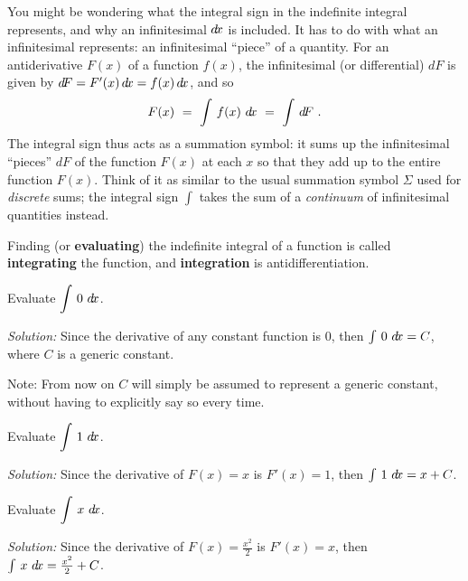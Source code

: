 \statecomment{\[
\ddx\,\left(\int\,f(x)~\dx\right) ~=~ f(x)
\]
}

You might be wondering what the integral sign in the indefinite integral
represents, and why an infinitesimal $d\!x$ is included. It has to do with what
an infinitesimal represents: an infinitesimal ``piece'' of a quantity. For an
antiderivative $F(x)$ of a function $f(x)$, the infinitesimal (or differential)
$d\!F$ is given by $d\!F = F'(x)\,d\!x = f(x)\,d\!x$, and so
\[
F(x) ~=~ \int\,f(x)~d\!x ~=~ \int\,d\!F ~.
\]
The integral sign thus acts as a summation symbol: it sums up the infinitesimal
``pieces'' $d\!F$ of the function $F(x)$ at each $x$ so that they add up to the
entire function $F(x)$. Think of it as similar to the usual summation symbol
$\Sigma$ used for \emph{discrete} sums; the integral sign $\int$ takes the sum
of a \emph{continuum} of infinitesimal quantities instead.

Finding (or \textbf{evaluating}) the indefinite integral of a function is
called \textbf{integrating} the function, and
\textbf{integration} is antidifferentiation.

\begin{exmp}\label{exmp:antideriv1}
\noindent Evaluate $\displaystyle\int\,0~d\!x$.\vspace{1mm}
\par\noindent\emph{Solution:} Since the derivative of any constant function is
0, then $\int\,0~d\!x = C$, where $C$ is a generic constant.\vspace{2mm}

\noindent Note: From now on $C$ will simply be assumed to represent a generic
constant, without having to explicitly say so every time.
\end{exmp}
\begin{exmp}\label{exmp:antideriv2}
\noindent Evaluate $\displaystyle\int\,1~d\!x$.\vspace{1mm}
\par\noindent\emph{Solution:} Since the derivative of $F(x) = x$ is
$F'(x) = 1$, then $\int\,1~d\!x = x + C$.
\end{exmp}
\begin{exmp}\label{exmp:antideriv3}
\noindent Evaluate $\displaystyle\int\,x~d\!x$.\vspace{1mm}
\par\noindent\emph{Solution:} Since the derivative of $F(x) = \frac{x^2}{2}$ is
$F'(x) = x$, then $\int\,x~d\!x = \frac{x^2}{2} + C$.
\end{exmp}
\divider
\vspace{3mm}


